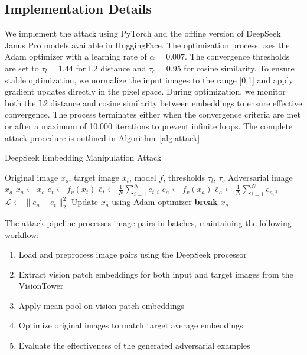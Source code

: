 \documentclass[runningheads]{llncs}
\begin{document}
\subsection{Implementation Details}
We implement the attack using PyTorch and the offline version of DeepSeek Janus Pro models available in HuggingFace. The optimization process uses the Adam optimizer with a learning rate of $\alpha = 0.007$. The convergence thresholds are set to $\tau_l = 1.44$ for L2 distance and $\tau_c = 0.95$ for cosine similarity. To ensure stable optimization, we normalize the input images to the range [0,1] and apply gradient updates directly in the pixel space. During optimization, we monitor both the L2 distance and cosine similarity between embeddings to ensure effective convergence. The process terminates either when the convergence criteria are met or after a maximum of 10,000 iterations to prevent infinite loops. The complete attack procedure is outlined in Algorithm~\ref{alg:attack}
\begin{algorithm}[ht!]
\caption{DeepSeek Embedding Manipulation Attack}
\label{alg:attack}
\begin{algorithmic}[1]
\REQUIRE Original image $x_o$, target image $x_t$, model $f$, thresholds $\tau_l$, $\tau_c$
\ENSURE Adversarial image $x_a$
\STATE $x_a \gets x_o$ 
\STATE $e_t \gets f_v(x_t)$ 
\STATE $\bar{e}_t \gets \frac{1}{N}\sum_{i=1}^N e_{t,i}$ 
    \STATE $e_a \gets f_v(x_a)$ 
    \STATE $\bar{e}_a \gets \frac{1}{N}\sum_{i=1}^N e_{a,i}$ 
    \STATE $\mathcal{L} \gets \|\bar{e}_a - \bar{e}_t\|_2^2$ 
    \STATE Update $x_a$ using Adam optimizer
        \STATE \textbf{break}
    \ENDIF
\ENDWHILE
\RETURN $x_a$
\end{algorithmic}
\end{algorithm}

The attack pipeline processes image pairs in batches, maintaining the following workflow:
\begin{enumerate}
    \item Load and preprocess image pairs using the DeepSeek processor
    \item Extract vision patch embeddings for both input and target images from the VisionTower
    \item Apply mean pool on vision patch embeddings
    \item Optimize original images to match target average embeddings
    \item Evaluate the effectiveness of the generated adversarial examples
\end{enumerate}
\end{document}

